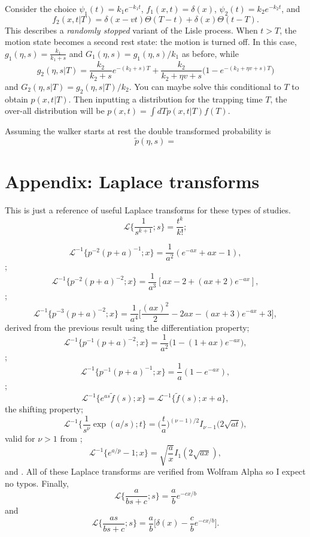 \documentclass[11pt]{article}
\newcommand\be{\begin{equation}} %
\newcommand\ee{\end{equation}}   %
\newcommand\El{\mathcal{L}}
\begin{document}
Consider the choice $\psi_1(t) = k_1e^{-k_1t}$, $f_1(x,t)=\delta(x)$, $\psi_2(t) = k_2e^{-k_2t}$, and 
\be f_2(x,t|T) = \delta(x-vt)\Theta(T-t) + \delta(x)\Theta(t-T).\ee
This describes a \textit{randomly stopped} variant of the Lisle process.
When $t>T$, the motion state becomes a second rest state: the motion is turned off.
In this case, $g_1(\eta,s) = \frac{k_1}{k_1+s}$ and $G_1(\eta,s) = g_1(\eta,s)/k_1$ as before, while
\be g_2(\eta,s|T) = \frac{k_2}{k_2+s}e^{-(k_2+s)T} + \frac{k_2}{k_2 + \eta v + s}\Big(1-e^{-(k_2 + \eta v + s)T}\Big)\ee
and $G_2(\eta,s|T) = g_2(\eta,s|T)/k_2$.
You can maybe solve this conditional to $T$ to obtain $p(x,t|T)$.
Then inputting a distribution for the trapping time $T$, the over-all distribution will be $p(x,t) = \int dT p(x,t|T)f(T)$.

Assuming the walker starts at rest the double transformed probability is
\be \tilde{p}(\eta,s) = \ee


\section*{Appendix: Laplace transforms}
This is just a reference of useful Laplace transforms for these types of studies.
\be \El\Big\{\frac{1}{s^{k+1}};s\Big\} = \frac{t^k}{k!}; \label{eq:lap1}\ee

\be \El^{-1}\Big\{p^{-2}(p+a)^{-1};x\Big\} = \frac{1}{a^2}(e^{-ax}+ax-1),\label{eq:lap2}\ee
\citep[][2.1.2.33]{Prudnikov1986};
\be \El^{-1}\Big\{p^{-2}(p+a)^{-2};x\Big\} = \frac{1}{a^3}[ax - 2 + (ax+2)e^{-ax}],\label{eq:lap3}\ee
\citep[][2.1.2.49]{Prudnikov1986};
\be \El^{-1}\Big\{p^{-3}(p+a)^{-2};x\Big\} = \frac{1}{a^4}\Big[\frac{(ax)^2}{2} - 2ax - (ax+3)e^{-ax} + 3\Big], \label{eq:lap4}\ee
derived from the previous result using the differentiation property;
\be \El^{-1}\Big\{p^{-1}(p+a)^{-2};x\Big\} = \frac{1}{a^2}\Big(1 -(1+ax)e^{-ax}\Big), \label{eq:lap5}\ee
\citep[][2.1.2.47]{Prudnikov1986};
\be \El^{-1}\Big\{p^{-1}(p+a)^{-1};x\Big\} = \frac{1}{a}(1-e^{-ax}),\label{eq:lap6}\ee
\citep[][2.1.2.31]{Prudnikov1986};
\be\El^{-1} \{e^{as}\tilde{f}(s);x\} = \El^{-1}\{\tilde{f}(s);x+a\},\label{eq:lap7}\ee
the shifting property;
\be \El^{-1}\big\{\frac{1}{s^\nu}\exp(a/s);t\} = \Big(\frac{t}{a}\Big)^{(\nu-1)/2}I_{\nu-1}\big(2\sqrt{a t}\big), \label{eq:lap8}\ee
valid for $\nu>1$ from \citep[][2.2.2.1]{Prudnikov1986};
\be \El^{-1}\{e^{a/p}-1;x\} = \sqrt{\frac{a}{x}}I_1(2\sqrt{ax}),\label{eq:lap9}\ee
and \citep[][2.2.2.8]{Prudnikov1986}.
All of these Laplace transforms are verified from Wolfram Alpha so I expect no typos.
Finally,
\be \El\Big\{\frac{a}{bs+c};s\Big\} = \frac{a}{b}e^{-cx/b}\label{eq:lap10}\ee
and
\be \El\Big\{\frac{as}{bs+c};s\Big\} = \frac{a}{b}\Big[\delta(x) - \frac{c}{b}e^{-cx/b}\Big].\label{eq:lap11}\ee
\end{document}
